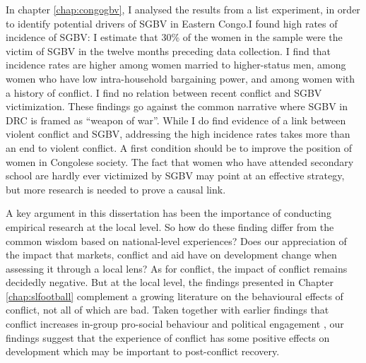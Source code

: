 
In chapter \ref{chap:congogbv}, I analysed the results from a list experiment, in order to identify potential drivers of SGBV in Eastern Congo.I found high rates of incidence of SGBV: I estimate that 30\% of the women in the sample were the victim of SGBV in the twelve months preceding data collection. I find that incidence rates are higher among women married to higher-status men, among women who have low intra-household bargaining power, and among women with a history of conflict. I find no relation between recent conflict and SGBV victimization. These findings go against the common narrative where SGBV in DRC is framed as ``weapon of war''. While I do find evidence of a link between violent conflict and SGBV, addressing the high incidence rates takes more than an end to violent conflict. A first condition should be to improve the position of women in Congolese society. The fact that women who have attended secondary school are hardly ever victimized by SGBV may point at an effective strategy, but more research is needed to prove a causal link.

A key argument in this dissertation has been the importance of conducting empirical research at the local level. So how do these finding differ from the common wisdom based on national-level experiences? Does our appreciation of the impact that markets, conflict and aid have on development change when assessing it through a local lens? As for conflict, the impact of conflict remains decidedly negative. But at the local level, the findings presented in Chapter \ref{chap:slfootball} complement a growing literature on the behavioural effects of conflict, not all of which are bad. Taken together with earlier findings that conflict increases in-group pro-social behaviour \cite{Bellows2009b,Voors2012,Gilligan2014,Bauer2014} and political engagement \cite{Bellows2009b,Blattman2009a}, our findings suggest that the experience of conflict has some positive effects on development which may be important to post-conflict recovery.

